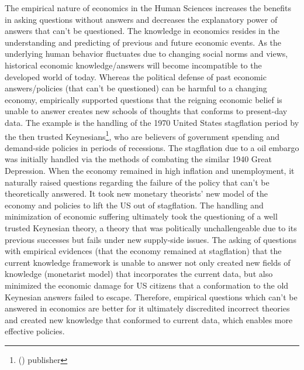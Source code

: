 \documentclass[a4paper,12pt]{article}
\newcommand{\citefoot}[1]{\footnote{\citeall{#1}}}
\newcommand{\citeall}[1]{\citeauth{#1} \citetitle{#1} (\citeyear{#1}) publisher \citelist{#1}{publisher}}
\begin{document}
The empirical nature of economics in the Human Sciences increases the benefits in asking questions without answers and decreases the explanatory power of answers that can’t be questioned. The knowledge in economics resides in the understanding and predicting of previous and future economic events. As the underlying human behavior fluctuates due to changing social norms and views, historical economic knowledge/answers will become incompatible to the developed world of today. Whereas the political defense of past economic answers/policies (that can't be questioned) can be harmful to a changing economy, empirically supported questions that the reigning economic belief is unable to answer creates new schools of thoughts that conforms to present-day data. The example is the handling of the 1970 United States stagflation period by the then trusted Keynesians\citefoot{nielsen_2022}, who are believers of government spending and demand-side policies in periods of recessions. The stagflation due to a oil embargo was initially handled via the methods of combating the similar 1940 Great Depression. When the economy remained in high inflation and unemployment, it naturally raised questions regarding the failure of the policy that can’t be theoretically answered. It took new monetary theorists’ new model of the economy and policies to lift the US out of stagflation. The handling and minimization of economic suffering ultimately took the questioning of a well trusted Keynesian theory, a theory that was politically unchallengeable due to its previous successes but fails under new supply-side issues. The asking of questions with empirical evidences (that the economy remained at stagflation) that the current knowledge framework is unable to answer not only created new fields of knowledge (monetarist model) that incorporates the current data, but also minimized the economic damage for US citizens that a conformation to the old Keynesian answers failed to escape. Therefore, empirical questions which can't be answered in economics are better for it ultimately discredited incorrect theories and created new knowledge that conformed to current data, which enables more effective policies.

\end{document}

